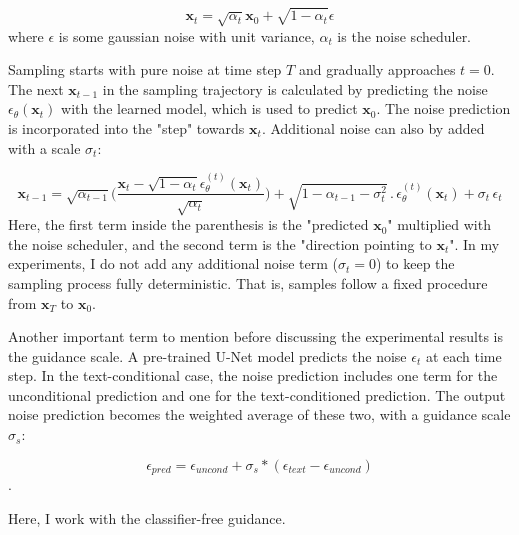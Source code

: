 \begin{equation}
\bm{x}_t = \sqrt{\alpha_t}\bm{x}_0 + \sqrt{1 - \alpha_t}\epsilon
\end{equation}
where $\epsilon$ is some gaussian noise with unit variance, $\alpha_t$ is the noise scheduler. 

Sampling starts with pure noise at time step $T$ and gradually approaches $t = 0$. The next $\bm{x}_{t-1}$ in the sampling trajectory is calculated by predicting the noise $\epsilon_{\theta}(\bm{x}_t)$ with the learned model, which is used to predict $\bm{x}_0$. The noise prediction is incorporated into the "step" towards $\bm{x}_t$. Additional noise can also by added with a scale $\sigma_t$:

\begin{equation}
\bm{x}_{t -1} = \sqrt{\alpha_{t - 1}}\biggl(\frac{\bm{x}_t - \sqrt{1 - \alpha_t}\epsilon_{\theta}^{(t)}(\bm{x}_t)}{\sqrt{\alpha_t}}\biggl) + \sqrt{1 - \alpha_{t - 1} - \sigma_t^2} \, . \, \epsilon_{\theta}^{(t)}(\bm{x}_t) + \sigma_t \, \epsilon_t
\label{eq:ddim-sample}
\end{equation}
Here, the first term inside the parenthesis is the "predicted $\bm{x}_0$" multiplied with the noise scheduler, and the second term is the "direction pointing to $\bm{x}_t$". In my experiments, I do not add any additional noise term ($\sigma_t = 0$) to keep the sampling process fully deterministic. That is, samples follow a fixed procedure from $\bm{x}_T$ to $\bm{x}_0$.

Another important term to mention before discussing the experimental results is the guidance scale. A pre-trained U-Net model predicts the noise $\epsilon_t$ at each time step. In the text-conditional case, the noise prediction includes one term for the unconditional prediction and one for the text-conditioned prediction. The output noise prediction becomes the weighted average of these two, with a guidance scale $\sigma_s$:

$$\epsilon_{pred} = \epsilon_{uncond} + \sigma_s * (\epsilon_{text} - \epsilon_{uncond} )$$.

Here, I work with the classifier-free guidance.

